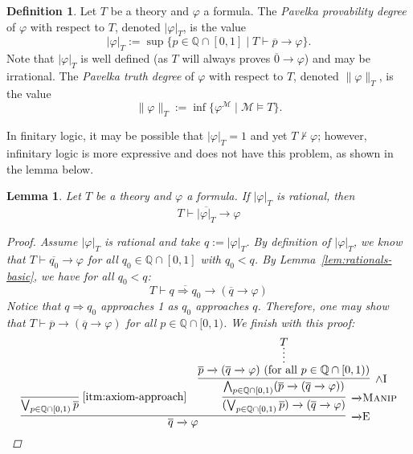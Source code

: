 \documentclass{amsart}
\newtheorem{lemma}[theorem]{Lemma}
\theoremstyle{definition}
\newtheorem{definition}[theorem]{Definition}
\numberwithin{equation}{theorem}
\renewcommand{\phi}{\varphi}
\newcommand{\Q}{\mathbb{Q}}
\newcommand{\where}{\mid}
\newcommand{\unwedge}{{\wedge}}
\newcommand{\proves}{\vdash}
\newcommand{\rat}[1]{{\overline{#1}}}
\newcommand{\narrow}[1]{\xrightarrow{#1}}
\renewcommand{\to}{\narrow{}}
\newcommand{\arr}{{\to}}
\newcommand{\intro}{\!\operatorname{I}}
\newcommand{\elim}{\!\operatorname{E}}
\newcommand{\aref}[1]{\!\text{\ref{itm:axiom-#1}}}
\newcommand{\pushdown}{\arr\text{\sc{Manip}}}
\begin{document}
\begin{definition}\label{def:proof-degree}
  Let $T$ be a theory and $\phi$ a formula.
  The \emph{Pavelka provability degree} of $\phi$ with respect to $T$, denoted $|\phi|_T$, is the value
  \[
    |\phi|_T:=\sup\{p\in\Q\cap[0,1]\where T\proves\rat p\to\phi\}.
  \]
  Note that $|\phi|_T$ is well defined (as $T$ will always proves $\rat 0\to\phi$) and may be irrational.
  The \emph{Pavelka truth degree} of $\phi$ with respect to $T$, denoted $\|\phi\|_T$, is the value
  \[
    \|\phi\|_T:=\inf\{\phi^\mathcal M\where \mathcal M\models T\}.
  \]
\end{definition}
In finitary logic, it may be possible that $|\phi|_T=1$ and yet $T\not\proves\phi$;
however, infinitary logic is more expressive and does not have this problem, as shown in the lemma below.
\begin{lemma}\label{lem:approach}
  Let $T$ be a theory and $\phi$ a formula.
  If $|\phi|_T$ is rational, then
  \[
    T\proves\rat{|\phi|_T}\to\phi
  \]
  \begin{proof}
    Assume $|\phi|_T$ is rational and take $q:=|\phi|_T$.
    By definition of $|\phi|_T$, we know that $T\proves\rat{q_0}\to\phi$ for all $q_0\in\Q\cap[0,1]$ with $q_0<q$.
    By Lemma~\ref{lem:rationals-basic}, we have for all $q_0<q$:
    \[
      T\proves\rat{q\Rightarrow q_0}\to(\rat q\to\phi)
    \]
    Notice that $q\Rightarrow q_0$ approaches 1 as $q_0$ approaches $q$.
    Therefore, one may show that $T\proves\rat p\to(\rat q\to\phi)$ for all $p\in\Q\cap[0,1)$.
    We finish with this proof:
    \[
      \infer[\arr\elim]{\rat q\to\phi}{
        \infer[\aref{approach}]{\bigvee_{p\in\Q\cap[0,1)}\rat p}{} &
        \infer[\pushdown]{(\bigvee_{p\in\Q\cap[0,1)}\rat p)\to(\rat q\to\phi)}{
          \infer[\unwedge\intro]{\bigwedge_{p\in\Q\cap[0,1)}(\rat p\to(\rat q\to\phi))}{
            \infer*{\rat p\to(\rat q\to\phi)\text{ (for all $p\in\Q\cap[0,1)$)}}{T}
          }
        }
      }\qedhere
    \]
  \end{proof}
\end{lemma}
\end{document}
